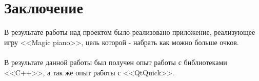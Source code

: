 \documentclass[a4paper,12pt]{article}
\begin{document}

\newpage
\section*{Заключение}
В результате работы над проектом было реализовано приложение, реализующее игру <<Magic piano>>, цель которой - набрать как можно больше очков.\\
\\
   В результате данной работы был получен опыт работы с библиотеками <<C++>>, а так же опыт работы с <<QtQuick>>.



\newpage
\appendix
\end{document}

